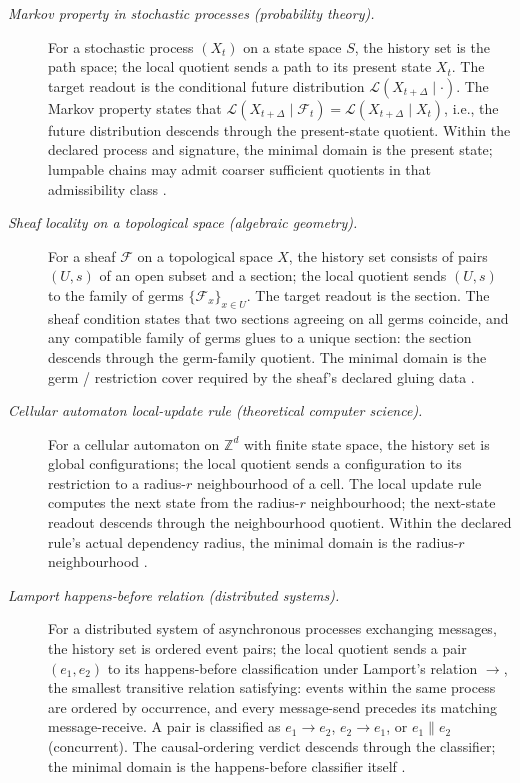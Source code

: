 \documentclass[11pt]{article}
\theoremstyle{definition}
\begin{document}
\begin{description}
\item[\emph{Markov property in stochastic processes
(probability theory).}]
For a stochastic process \((X_t)\) on a state space
\(S\), the history set is the path space; the local
quotient sends a path to its present state \(X_t\).
The target readout is the conditional future
distribution \(\mathcal L(X_{t+\Delta}\mid\cdot)\).
The Markov property states that
\(\mathcal L(X_{t+\Delta}\mid\mathcal F_t)
=\mathcal L(X_{t+\Delta}\mid X_t)\), i.e., the
future distribution descends through the
present-state quotient.  Within the declared
process and signature, the minimal domain is the
present state; lumpable chains may admit coarser
sufficient quotients in that admissibility class
\citep{Markov1906Investigation}.

\item[\emph{Sheaf locality on a topological space
(algebraic geometry).}]
For a sheaf \(\mathcal F\) on a topological space
\(X\), the history set consists of pairs
\((U,s)\) of an open subset and a section; the
local quotient sends \((U,s)\) to the family of
germs \(\{\mathcal F_x\}_{x\in U}\).  The target
readout is the section.  The sheaf condition
states that two sections agreeing on all germs
coincide, and any compatible family of germs glues
to a unique section: the section descends through
the germ-family quotient.  The minimal domain is
the germ / restriction cover required by the
sheaf's declared gluing data
\citep{Grothendieck1957Tohoku}.

\item[\emph{Cellular automaton local-update rule
(theoretical computer science).}]
For a cellular automaton on \(\mathbb Z^d\) with
finite state space, the history set is global
configurations; the local quotient sends a
configuration to its restriction to a radius-\(r\)
neighbourhood of a cell.  The local update rule
computes the next state from the radius-\(r\)
neighbourhood; the next-state readout descends
through the neighbourhood quotient.  Within the
declared rule's actual dependency radius, the
minimal domain is the radius-\(r\) neighbourhood
\citep{vonNeumann1966SelfReproducing}.

\item[\emph{Lamport happens-before relation
(distributed systems).}]
For a distributed system of asynchronous processes
exchanging messages, the history set is ordered
event pairs; the local quotient sends a pair
\((e_1,e_2)\) to its happens-before classification
under Lamport's relation \(\to\), the smallest
transitive relation satisfying: events within the
same process are ordered by occurrence, and every
message-send precedes its matching message-receive.
A pair is classified as \(e_1\to e_2\), \(e_2\to
e_1\), or \(e_1\parallel e_2\) (concurrent).  The
causal-ordering verdict descends through the
classifier; the minimal domain is the happens-before
classifier itself \citep{Lamport1978HappensBefore}.


\end{description}
\end{document}
